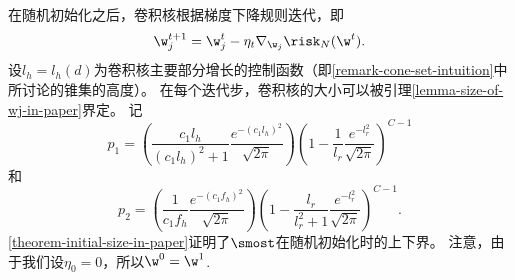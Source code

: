 在随机初始化之后，卷积核根据梯度下降规则迭代，即  
\begin{equation}
    \w^{t+1}_j = \w^t_j - \eta_t \nabla_{\w_j} \risk_N(\w^t).
\end{equation} 
设$l_h = l_h(d)$为卷积核主要部分增长的控制函数（即\cref{remark-cone-set-intuition}中所讨论的锥集的高度）。
在每个迭代步，卷积核的大小可以被引理\cref{lemma-size-of-wj-in-paper}界定。
记
\begin{equation}\label{eq-def-p1}
    p_1 =  
    \left( \frac{c_1 l_h}{(c_1 l_h)^2 + 1} \frac{ e^{-(c_1 l_h)^2} }{\sqrt{2\pi}} \right)
    \left(1 - \frac{1}{l_r} \frac{ e^{-l_r^2} }{\sqrt{2\pi}} \right)^{C-1}
\end{equation}
和
\begin{equation}\label{eq-def-p2}
    p_2 = 
    \left( \frac{1}{c_1f_h} \frac{ e^{-(c_1f_h)^2} }{\sqrt{2\pi}} \right)
    \left(1 - \frac{l_r}{l_r^2 + 1} \frac{ e^{-l_r^2} }{\sqrt{2\pi}} \right)^{C-1}.
\end{equation}
\cref{theorem-initial-size-in-paper}证明了$\smost$在随机初始化时的上下界。
注意，由于我们设$\eta_0 = 0$，所以$\w^0 = \w^1$.
